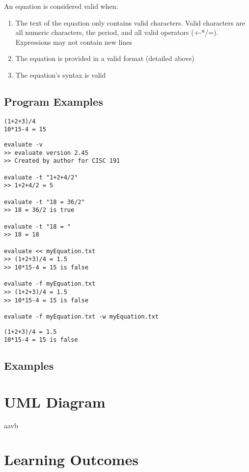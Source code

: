 \documentclass{article}
\begin{document}
An equation is considered valid when:
\begin{enumerate}
	\item The text of the equation only contains valid characters. Valid characters are all numeric characters, the period, and all valid operators (+-*/=). Expressions may not contain new lines
	\item The equation is provided in a valid format (detailed above)
	\item The equation's syntax is valid
\end{enumerate}

\subsection{Program Examples}
\begin{lstlisting}[title=myEquation.txt]
(1+2+3)/4
10*15-4 = 15
\end{lstlisting}

\begin{lstlisting}[title=Commands]
evaluate -v
>> evaluate version 2.45
>> Created by author for CISC 191

evaluate -t "1+2+4/2"
>> 1+2+4/2 = 5

evaluate -t "18 = 36/2"
>> 18 = 36/2 is true

evaluate -t "18 = "
>> 18 = 18

evaluate << myEquation.txt
>> (1+2+3)/4 = 1.5
>> 10*15-4 = 15 is false

evaluate -f myEquation.txt
>> (1+2+3)/4 = 1.5
>> 10*15-4 = 15 is false

evaluate -f myEquation.txt -w myEquation.txt
\end{lstlisting}

\begin{lstlisting}[title=myEquation.txt after commands are executed]
(1+2+3)/4 = 1.5
10*15-4 = 15 is false
\end{lstlisting}

\subsection{Examples}



\section{UML Diagram}
aavb
\section{Learning Outcomes}
\end{document}
